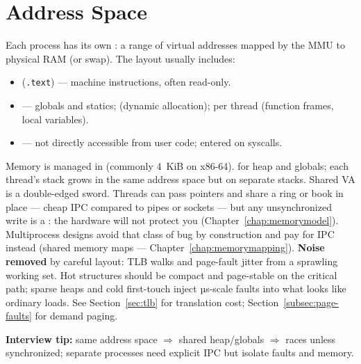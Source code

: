 \section{Address Space}
\label{sec:address-space}
Each process has its own : a range of virtual addresses mapped 
by the MMU to physical RAM (or swap). The layout usually includes:
\begin{itemize}
    \item {} (\texttt{.text}) --- machine instructions, often read-only.
    \item {} --- globals and statics;  (dynamic allocation); 
           per thread (function frames, local variables).
    \item {} --- not directly accessible from user code; entered on syscalls.
\end{itemize}
Memory is managed in  (commonly 4~KiB on x86-64). 
 for heap and globals; 
each thread's stack grows in the same address space but on separate stacks.
\newline
Shared VA is a double-edged sword. Threads can pass pointers and share a ring or book in place --- 
cheap IPC compared to pipes or sockets --- but any unsynchronized write is a : 
the hardware will not protect you (Chapter~\ref{chap:memorymodel}). Multiprocess designs avoid that 
class of bug by construction and pay for IPC instead (shared memory maps --- Chapter~\ref{chap:memorymapping}).
\newline
\textbf{Noise removed} by careful layout: TLB walks and page-fault jitter from a sprawling working set. 
Hot structures should be compact and page-stable on the critical path; sparse heaps and cold first-touch 
inject µs-scale faults into what looks like ordinary loads. See Section~\ref{sec:tlb} for translation 
cost; Section~\ref{subsec:page-faults} for demand paging.
\par\noindent\textbf{Interview tip:} same address space $\Rightarrow$ shared heap/globals $\Rightarrow$ races unless 
synchronized; separate processes need explicit IPC but isolate faults and memory.

